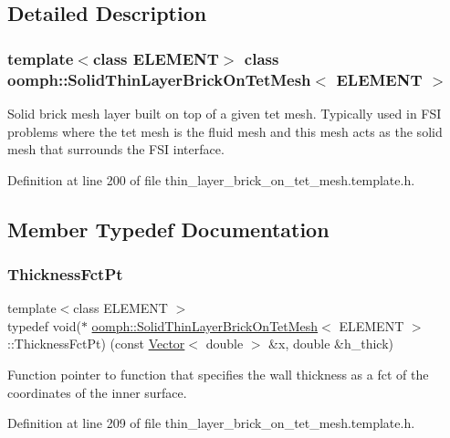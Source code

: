 \subsection{Detailed Description}
\subsubsection*{template$<$class E\+L\+E\+M\+E\+NT$>$\newline
class oomph\+::\+Solid\+Thin\+Layer\+Brick\+On\+Tet\+Mesh$<$ E\+L\+E\+M\+E\+N\+T $>$}

Solid brick mesh layer built on top of a given tet mesh. Typically used in F\+SI problems where the tet mesh is the fluid mesh and this mesh acts as the solid mesh that surrounds the F\+SI interface. 

Definition at line 200 of file thin\+\_\+layer\+\_\+brick\+\_\+on\+\_\+tet\+\_\+mesh.\+template.\+h.



\subsection{Member Typedef Documentation}
\mbox{\label{classoomph_1_1SolidThinLayerBrickOnTetMesh_ae4289650b0c0eccb2fd3d661b85e85ee}} 
\subsubsection{\texorpdfstring{Thickness\+Fct\+Pt}{ThicknessFctPt}}
{\footnotesize\ttfamily template$<$class E\+L\+E\+M\+E\+NT $>$ \\
typedef void($\ast$ \hyperlink{classoomph_1_1SolidThinLayerBrickOnTetMesh}{oomph\+::\+Solid\+Thin\+Layer\+Brick\+On\+Tet\+Mesh}$<$ E\+L\+E\+M\+E\+NT $>$\+::Thickness\+Fct\+Pt) (const \hyperlink{classoomph_1_1Vector}{Vector}$<$ double $>$ \&x, double \&h\+\_\+thick)}



Function pointer to function that specifies the wall thickness as a fct of the coordinates of the inner surface. 



Definition at line 209 of file thin\+\_\+layer\+\_\+brick\+\_\+on\+\_\+tet\+\_\+mesh.\+template.\+h.



